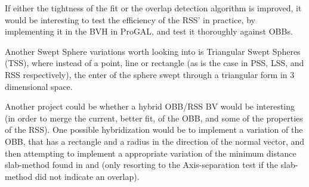 If either the tightness of the fit or the overlap detection algorithm is improved, it would be interesting to test the efficiency of the RSS' in practice, by implementing it in the BVH in ProGAL, and test it thoroughly against OBBs. 

Another Swept Sphere variations worth looking into is Triangular Swept Spheres (TSS), where instead of a point, line or rectangle (as is the case in PSS, LSS, and RSS respectively), the enter of the sphere swept through a triangular form in 3 dimensional space. 

Another project could be whether a hybrid OBB/RSS BV would be interesting (in order to merge the current, better fit, of the OBB, and some of the properties of the RSS). One possible hybridization would be to implement a variation of the OBB, that has a rectangle and a radius in the direction of the normal vector, and then attempting to implement a appropriate variation of the minimum distance slab-method found in \cite{larsen00fast} and \cite{Larsen99fastproximity} (only resorting to the Axis-separation test if the slab-method did not indicate an overlap).
